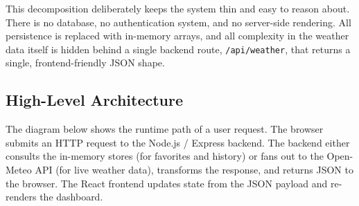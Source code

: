 \documentclass[11pt,letterpaper]{article}
\begin{document}
This decomposition deliberately keeps the system thin and easy to reason about. There is no database, no authentication system, and no server-side rendering. All persistence is replaced with in-memory arrays, and all complexity in the weather data itself is hidden behind a single backend route, \texttt{/api/weather}, that returns a single, frontend-friendly JSON shape.

\subsection{High-Level Architecture}
The diagram below shows the runtime path of a user request. The browser submits an HTTP request to the Node.js / Express backend. The backend either consults the in-memory stores (for favorites and history) or fans out to the Open-Meteo API (for live weather data), transforms the response, and returns JSON to the browser. The React frontend updates state from the JSON payload and re-renders the dashboard.
\end{document}
